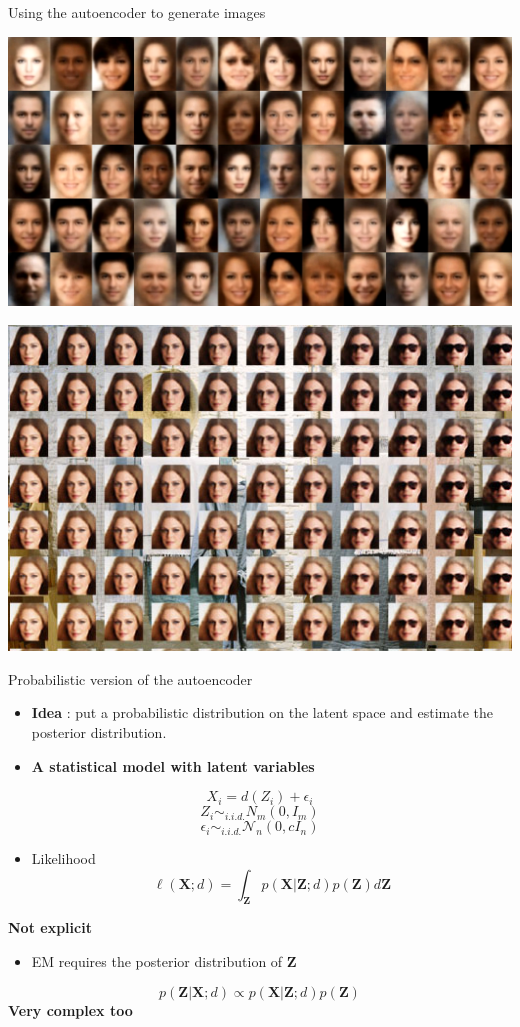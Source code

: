 \documentclass[compress,10pt]{beamer}
\begin{document}
\begin{frame}{Using the autoencoder to generate images}

\begin{center}
\includegraphics[width=0.7\linewidth]{images/autoEncoder1_example} 
\end{center}

\begin{center}
\includegraphics[width=0.7\linewidth]{images/autoEncoder2_example} 
\end{center}
\end{frame}


\begin{frame}{Probabilistic version of the autoencoder}
\protect\hypertarget{probabilistic-version-of-the-autoencoder}{}
\begin{itemize}
\item
  \textbf{Idea} : put a probabilistic distribution on the latent space and
  estimate the posterior distribution.
\item
  \textbf{A statistical model with latent variables}
\end{itemize}

\[X_i =d(Z_i) + \epsilon_i\] \[Z_i \sim_{i.i.d.}N_m(0,I_m)\]
\[\epsilon_i \sim_{i.i.d.} \mathcal{N}_n(0,c I_n)\]

\begin{itemize}
\item
  Likelihood
  \[\ell(\mathbf{X}; d)  =  \int_{\mathbf{Z}} p(\mathbf{X} | \mathbf{Z};d)p(\mathbf{Z})d\mathbf{Z}\]
\end{itemize}

\textbf{Not explicit}

\begin{itemize}
\item
  EM requires the posterior distribution of \(\mathbf{Z}\)
\end{itemize}

\[p(\mathbf{Z} | \mathbf{X}; d) \propto p(\mathbf{X}|\mathbf{Z}; d)p(\mathbf{Z}) \]
\textbf{Very complex too}
\end{frame}
\end{document}
